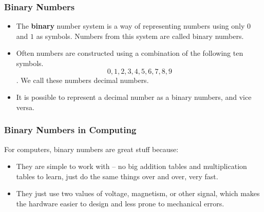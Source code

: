 \documentclass{beamer}
\begin{document}
\begin{frame}
\frametitle{Binary Numbers}
\Large
\begin{itemize}
\item The \textbf{binary} number system is a way of representing numbers using only $0$ and $1$ as symbols. Numbers from this system are called binary numbers.
\item Often numbers are constructed using a combination of the following ten symbols.
\[ 0,1,2,3,4,5,6,7,8,9\]. We call these numbers decimal numbers.
\item It is possible to represent a decimal number as a binary numbers, and vice versa.
\end{itemize}
\end{frame}
\begin{frame}
\frametitle{Binary Numbers in Computing}


For computers, binary numbers are great stuff because:
\begin{itemize}
\item They are simple to work with -- no big addition tables and multiplication tables to learn, just do the same things over and over, very fast.
\item They just use two values of voltage, magnetism, or other signal, which makes the hardware easier to design and less prone to mechanical errors.
\end{itemize}


\end{frame}
\end{document}
